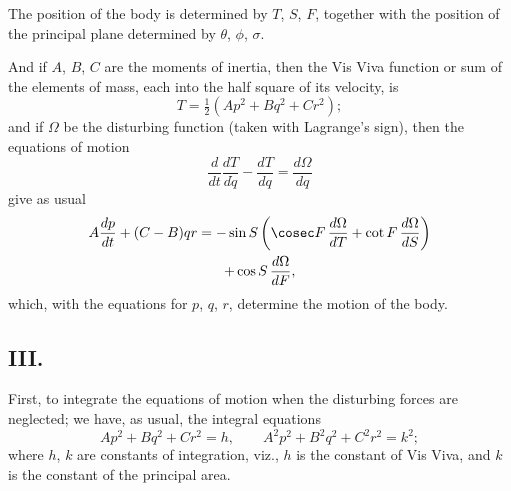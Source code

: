 \documentclass[11pt,a4paper]{book}
\begin{document}
The position of the body is determined by $T$, $S$, $F$, together with the position of the principal plane determined by $\theta$, $\phi$, $\sigma$.

And if $A$, $B$, $C$ are the moments of inertia, then the Vis Viva function or sum of the elements of mass, each into the half square of its velocity, is
\[
T = \tfrac{1}{2}(Ap^2 + Bq^2 + Cr^2);
\]
and if $\Omega$ be the disturbing function (taken with Lagrange's sign), then the equations of motion
\[
\frac{d}{dt}\frac{dT}{d\dot{q}} - \frac{dT}{dq} = \frac{d\Omega}{dq}
\]
give as usual
\begin{multline}
A\frac{dp}{dt} + (C-B)qr = -\sin S\left(\cosec F\,\frac{d\Omega}{dT} + \cot F\,\frac{d\Omega}{dS}\right) \notag\\
+ \cos S\,\frac{d\Omega}{dF},
\end{multline}
which, with the equations for $p$, $q$, $r$, determine the motion of the body.

\subsection*{III.}

First, to integrate the equations of motion when the disturbing forces are neglected; we have, as usual, the integral equations
\[
Ap^2 + Bq^2 + Cr^2 = h, \qquad A^2p^2 + B^2q^2 + C^2r^2 = k^2;
\]
where $h$, $k$ are constants of integration, viz., $h$ is the constant of Vis Viva, and $k$ is the constant of the principal area.
\end{document}
